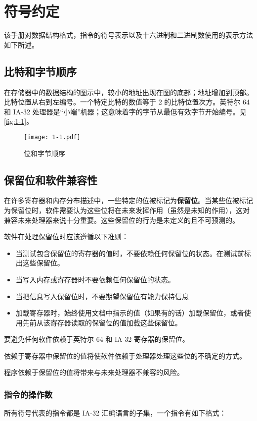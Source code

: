 \section{符号约定}
该手册对数据结构格式，指令的符号表示以及十六进制和二进制数使用的表示方法如下所述。
\subsection{比特和字节顺序}
在存储器中的数据结构的图示中，较小的地址出现在图的底部；地址增加到顶部。比特位置从右到左编号。一个特定比特的数值等于 2 的比特位置次方。英特尔 64 和 IA-32 处理器是“小端”机器；这意味着字的字节从最低有效字节开始编号。见 \autoref{fig:1-1}。
\begin{figure}[H]
\centering
\texttt{[image: 1-1.pdf]}
\caption{位和字节顺序}
\label{fig:1-1}
\end{figure}

\subsection{保留位和软件兼容性}
在许多寄存器和内存分布描述中，一些特定的位被标记为\textbf{保留位}。当某些位被标记为保留位时，软件需要认为这些位将在未来发挥作用（虽然是未知的作用），这对兼容未来处理器来说十分重要。这些保留位的行为是未定义的且不可预测的。

软件在处理保留位时应该遵循以下准则：
\begin{itemize}
	\item 当测试包含保留位的寄存器的值时，不要依赖任何保留位的状态。在测试前标出这些保留位。
	\item 当写入内存或寄存器时不要依赖任何保留位的状态。
	\item 当把信息写入保留位时，不要期望保留位有能力保持信息
	\item 加载寄存器时，始终使用文档中指示的值（如果有的话）加载保留位，或者使用先前从该寄存器读取的保留位的值加载这些保留位。
\end{itemize}

\begin{center}
{\Large {}}
\end{center}

要避免任何软件依赖于英特尔 64 和 IA-32 寄存器的保留位。

依赖于寄存器中保留位的值将使软件依赖于处理器处理这些位的不确定的方式。

程序依赖于保留位的值将带来与未来处理器不兼容的风险。

\subsubsection{指令的操作数}
所有符号代表的指令都是 IA-32 汇编语言的子集，一个指令有如下格式：

